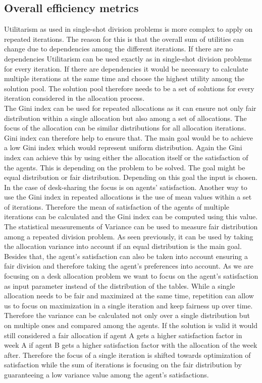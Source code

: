 \documentclass[german, a4paper, 11pt, oneside]{scrbook}
\begin{document}
\subsection{Overall efficiency metrics}
Utilitarism as used in single-shot division problems is more complex to apply on repeated iterations. The reason for this is that the overall sum of utilities can change due to dependencies among the different iterations. If there are no dependencies Utilitarism can be used exactly as in single-shot division problems for every iteration. If there are dependencies it would be necessary to calculate multiple iterations at the same time and choose the highest utility among the solution pool. The solution pool therefore needs to be a set of solutions for every iteration considered in the allocation process.\\
The Gini index can be used for repeated allocations as it can ensure not only fair distribution within a single allocation but also among a set of allocations. The focus of the allocation can be similar distributions for all allocation iterations. Gini index can therefore help to ensure that. The main goal would be to achieve a low Gini index which would represent uniform distribution. Again the Gini index can achieve this by using either the allocation itself or the satisfaction of the agents. This is depending on the problem to be solved. The goal might be equal distribution or fair distribution. Depending on this goal the input is chosen. In the case of desk-sharing the focus is on agents' satisfaction. Another way to use the Gini index in repeated allocations is the use of mean values within a set of iterations. Therefore the mean of satisfaction of the agents of multiple iterations can be calculated and the Gini index can be computed using this value. 
\\
The statistical measurements of Variance can be used to measure fair distribution among a repeated division problem. As seen previously, it can be used by taking the allocation variance into account if an equal distribution is the main goal. Besides that, the agent's satisfaction can also be taken into account ensuring a fair division and therefore taking the agent's preferences into account. As we are focusing on a desk allocation problem we want to focus on the agent's satisfaction as input parameter instead of the distribution of the tables. While a single allocation needs to be fair and maximized at the same time, repetition can allow us to focus on maximization in a single iteration and keep fairness up over time. Therefore the variance can be calculated not only over a single distribution but on multiple ones and compared among the agents. If the solution is valid it would still considered a fair allocation if agent A gets a higher satisfaction factor in week A if agent B gets a higher satisfaction factor with the allocation of the week after. Therefore the focus of a single iteration is shifted towards optimization of satisfaction while the sum of iterations is focusing on the fair distribution by guaranteeing a low variance value among the agent's satisfactions.
\end{document}
